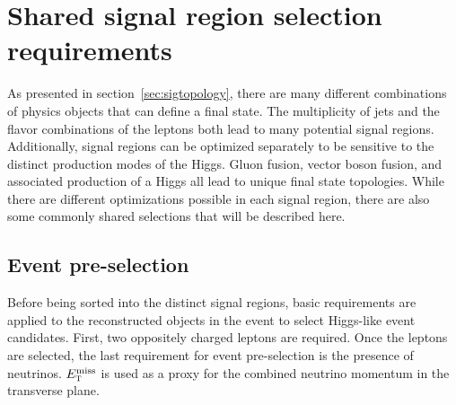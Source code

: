 


\section{Shared signal region selection requirements}

As presented in section~\ref{sec:sigtopology}, there are many different combinations of physics objects that can define a \HWWfull final state. The multiplicity of jets and the flavor combinations of the leptons both lead to many potential signal regions. Additionally, signal regions can be optimized separately to be sensitive to the distinct production modes of the Higgs. Gluon fusion, vector boson fusion, and associated production of a Higgs all lead to unique final state topologies. While there are different optimizations possible in each signal region, there are also some commonly shared selections that will be described here.

\subsection{Event pre-selection}
\label{sec:HWW_presel}
Before being sorted into the distinct signal regions, basic requirements are applied to the reconstructed objects in the event to select Higgs-like event candidates. First, two oppositely charged leptons are required. Once the leptons are selected, the last requirement for event pre-selection is the presence of neutrinos. $E_{\textrm{\footnotesize\sc t}}^{\rm miss}$ is used as a proxy for the combined neutrino momentum in the transverse plane. 

